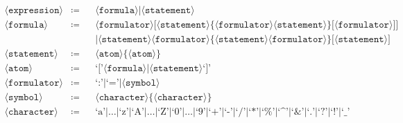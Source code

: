 \documentclass[british]{article}
\newcommand{\expression}{\langle\texttt{expression}\rangle}
\newcommand{\statement}{\langle\texttt{statement}\rangle}
\newcommand{\formula}{\langle\texttt{formula}\rangle}
\newcommand{\formulator}{\langle\texttt{formulator}\rangle}
\newcommand{\character}{\langle\texttt{character}\rangle}
\newcommand{\atom}{\langle\texttt{atom}\rangle}
\newcommand{\symb}{\langle\texttt{symbol}\rangle}
\begin{document}


\begin{align*}
\expression	& \coloneqq &&	\formula \Big| \statement\\
\formula	& \coloneqq &&	\formulator \bigg[ \statement \Big\{ \formulator
							\statement \Big\} \Big[ \formulator \Big] \bigg]\\
			&           &&	\Big| \statement \formulator \Big\{ \statement
							\formulator \Big\} \Big[ \statement \Big]\\
\statement	& \coloneqq &&  \atom \Big\{ \atom \Big\}\\
\atom		& \coloneqq &&  \textrm{`['} \formula \Big| \statement \textrm{`]'}\\
\formulator & \coloneqq &&	\textrm{`:'} \Big| \textrm{`='} \Big| \symb\\
\symb		& \coloneqq &&  \character \Big\{ \character \Big\}\\
\character	& \coloneqq &&  \textrm{`a'} \Big| \dots \Big| \textrm{`z'} \Big|
							\textrm{`A'} \Big| \dots \Big| \textrm{`Z'} \Big|
							\textrm{`0'} \Big| \dots \Big| \textrm{`9'} \Big|
							\textrm{`+'} \Big| \textrm{`-'} \Big| \textrm{`/'}
							\Big| \textrm{`*'} \Big|\textrm{`\%'} \Big|
							\textrm{`\textasciicircum'} \Big| \textrm{`\&'}
							\Big| \textrm{`.'} \Big|\textrm{`?'} \Big|
							\textrm{`!'} \Big| \textrm{`\_'}
\end{align*}
\end{document}
